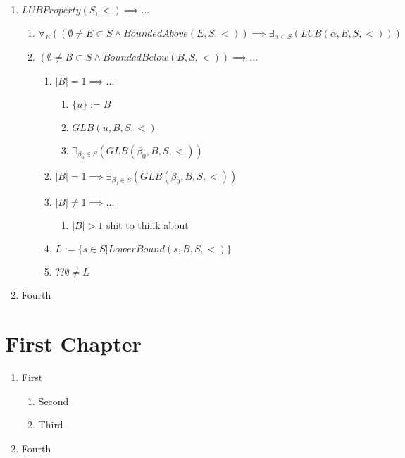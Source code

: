 \documentclass{book}
\newcommand{\rf}[1]{#1}
\newcommand{\abr}{:=}
\newcommand{\pr}[1]{\left(#1\right)}
\begin{document}
\begin{enumerate}
  \item $\rf{LUBProperty}(S, <) \implies \ldots$
  \begin{enumerate}
    \item $\forall_{E}\pr{\pr{\emptyset \neq E \subset S \land \rf{BoundedAbove}(E, S, <)} \implies \exists_{\alpha \in S}\pr{\rf{LUB}(\alpha, E, S, <)}}$
    \item $(\emptyset \neq B \subset S \land \rf{BoundedBelow}(B, S, <)) \implies \ldots$
    \begin{enumerate}
      \item $|B| = 1 \implies \ldots$
      \begin{enumerate}
        \item $\{u\} \abr B$
        \item $\rf{GLB}(u, B, S, <)$
        \item $\exists_{\beta_0 \in S}\pr{\rf{GLB}(\beta_0, B, S, <)}$
      \end{enumerate}
      \item $|B| = 1 \implies \exists_{\beta_0 \in S}\pr{\rf{GLB}(\beta_0, B, S, <)}$
      \item $|B| \neq 1 \implies \ldots$
      \begin{enumerate}
        \item $|B| > 1$ shit to think about
        
      \end{enumerate}
      \item $L \abr \{s \in S | \rf{LowerBound}(s, B, S, <)\}$
      \item $?? \emptyset \neq L$


    \end{enumerate}
  \end{enumerate}
  \item Fourth
\end{enumerate}









\chapter{First Chapter}

\begin{enumerate}
  \item First
  \begin{enumerate}
    \item Second
    \item Third
  \end{enumerate}
  \item Fourth
\end{enumerate}
\end{document}
